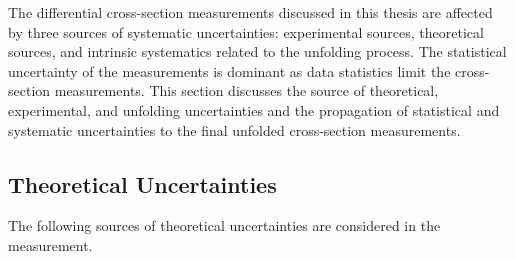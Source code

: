 The differential cross-section measurements discussed in this thesis are affected by three sources of systematic uncertainties: experimental sources, theoretical sources, and intrinsic systematics related to the unfolding process. The statistical uncertainty of the measurements is dominant as data statistics limit the cross-section measurements. This section discusses the source of theoretical, experimental, and unfolding uncertainties and the propagation of statistical and systematic uncertainties to the final unfolded cross-section measurements. 

\subsection{Theoretical Uncertainties}
\label{subsec:TheoryUnc}

The following sources of theoretical uncertainties are considered in the measurement.

